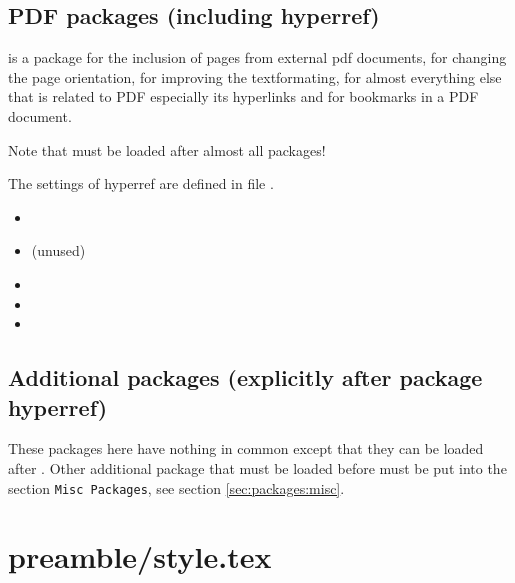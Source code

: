 \subsection{PDF packages (including hyperref)}
\label{sec:packages:pdf}

 is a package for the inclusion of pages from external pdf documents,
 for changing the page orientation,
 for improving the textformating,
 for almost everything else that is related to PDF especially its hyperlinks and 
 for bookmarks in a PDF document.

Note that  must be loaded after almost all packages!

The settings of hyperref are defined in file 
.

\begin{itemize}[noitemsep]
\item {}
\item {} (unused)
\item {}
\item {}
\item {}
\end{itemize}


\subsection{Additional packages  (explicitly after package hyperref)}
\label{sec:packages:additional}

These packages here have nothing in common except that they can be loaded after . Other additional package that must be loaded before must be put into the section \texttt{Misc Packages}, see section \cref{sec:packages:misc}.


\section{preamble/style.tex}

